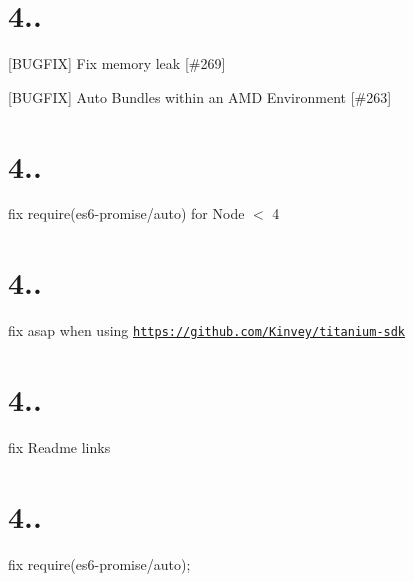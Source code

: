 \section*{4..}


\begin{DoxyItemize}
\item \mbox{[}B\+U\+G\+F\+IX\mbox{]} Fix memory leak \mbox{[}\#269\mbox{]}
\item \mbox{[}B\+U\+G\+F\+IX\mbox{]} Auto Bundles within an A\+MD Environment \mbox{[}\#263\mbox{]}
\end{DoxyItemize}

\section*{4..}


\begin{DoxyItemize}
\item fix require(\textquotesingle{}es6-\/promise/auto\textquotesingle{}) for Node $<$ 4
\end{DoxyItemize}

\section*{4..}


\begin{DoxyItemize}
\item fix asap when using \href{https://github.com/Kinvey/titanium-sdk}{\tt https\+://github.\+com/\+Kinvey/titanium-\/sdk}
\end{DoxyItemize}

\section*{4..}


\begin{DoxyItemize}
\item fix Readme links
\end{DoxyItemize}

\section*{4..}


\begin{DoxyItemize}
\item fix require(\textquotesingle{}es6-\/promise/auto\textquotesingle{});
\end{DoxyItemize}

